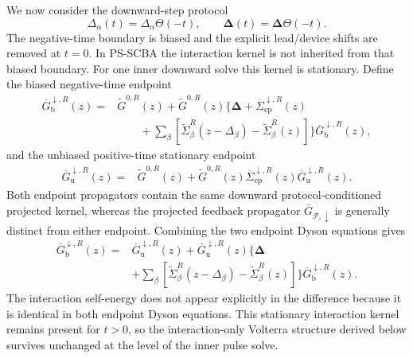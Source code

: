 \documentclass[
 reprint,
 superscriptaddress,
 amsmath,amssymb,
 aps,prb,
 longbibliography,
 floatfix
]{revtex4-2}
\newcommand{\ep}{\mathrm{ep}}
\newcommand{\barSigma}{\overline{\Sigma}}
\begin{document}
We now consider the downward-step protocol
\begin{equation*}
\Delta_\alpha(t)
=
\Delta_\alpha\Theta(-t),
\qquad
\bm\Delta(t)
=
\bm\Delta\Theta(-t).
\end{equation*}
The negative-time boundary is biased and the explicit lead/device shifts are removed at \(t=0\). In PS-SCBA the interaction kernel is not inherited from that biased boundary. For one inner downward solve this kernel is stationary. Define the biased negative-time endpoint
\begin{equation*}
\begin{aligned}
\overline G_{\mathrm b}^{\downarrow,R}(z)
={}&
\widetilde G^{0,R}(z)+
\widetilde G^{0,R}(z)
\Bigg\{
\bm\Delta
+
\barSigma_{\ep}^{\downarrow,R}(z)
\\
&\qquad+
\sum_\beta
\left[
\widetilde\Sigma_\beta^R(z-\Delta_\beta)
-
\widetilde\Sigma_\beta^R(z)
\right]
\Bigg\}
\overline G_{\mathrm b}^{\downarrow,R}(z),
\end{aligned}
\end{equation*}
and the unbiased positive-time stationary endpoint
\begin{equation}
\begin{aligned}
\overline G_{\mathrm u}^{\downarrow,R}(z)
={}&
\widetilde G^{0,R}(z)+
\widetilde G^{0,R}(z)
\barSigma_{\ep}^{\downarrow,R}(z)
\overline G_{\mathrm u}^{\downarrow,R}(z).
\end{aligned}
\label{eq:down-unbiased-psscba-dyson}
\end{equation}
Both endpoint propagators contain the same downward protocol-conditioned projected kernel, whereas the projected feedback propagator \(\bar G_{\mathcal P,\downarrow}\) is generally distinct from either endpoint. Combining the two endpoint Dyson equations gives
\begin{equation*}
\begin{aligned}
\overline G_{\mathrm b}^{\downarrow,R}(z)
={}&
\overline G_{\mathrm u}^{\downarrow,R}(z)
+
\overline G_{\mathrm u}^{\downarrow,R}(z)
\Bigg\{
\bm\Delta
\\
&+
\sum_\beta
\left[
\widetilde\Sigma_\beta^R(z-\Delta_\beta)
-
\widetilde\Sigma_\beta^R(z)
\right]
\Bigg\}
\overline G_{\mathrm b}^{\downarrow,R}(z).
\end{aligned}
\end{equation*}
The interaction self-energy does not appear explicitly in the difference because it is identical in both endpoint Dyson equations. This stationary interaction kernel remains present for \(t>0\), so the interaction-only Volterra structure derived below survives unchanged at the level of the inner pulse solve.
\end{document}
